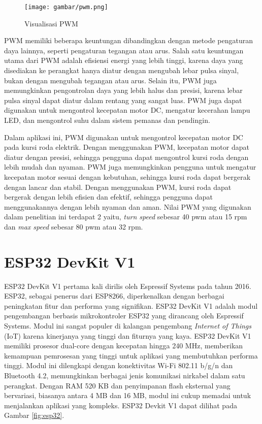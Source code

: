 \begin{figure} [ht] \centering
  \texttt{[image: gambar/pwm.png]}
  \caption{Visualisasi PWM}
  \label{fig:pwm}
\end{figure}

PWM memiliki beberapa keuntungan dibandingkan dengan metode pengaturan daya lainnya, seperti pengaturan tegangan atau arus. Salah satu keuntungan utama dari PWM adalah efisiensi energi yang lebih tinggi, karena daya yang disediakan ke perangkat hanya diatur dengan mengubah lebar pulsa sinyal, bukan dengan mengubah tegangan atau arus. Selain itu, PWM juga memungkinkan pengontrolan daya yang lebih halus dan presisi, karena lebar pulsa sinyal dapat diatur dalam rentang yang sangat luas. PWM juga dapat digunakan untuk mengontrol kecepatan motor DC, mengatur kecerahan lampu LED, dan mengontrol suhu dalam sistem pemanas dan pendingin.

Dalam aplikasi ini, PWM digunakan untuk mengontrol kecepatan motor DC pada kursi roda elektrik. Dengan menggunakan PWM, kecepatan motor dapat diatur dengan presisi, sehingga pengguna dapat mengontrol kursi roda dengan lebih mudah dan nyaman. PWM juga memungkinkan pengguna untuk mengatur kecepatan motor sesuai dengan kebutuhan, sehingga kursi roda dapat bergerak dengan lancar dan stabil. Dengan menggunakan PWM, kursi roda dapat bergerak dengan lebih efisien dan efektif, sehingga pengguna dapat menggunakannya dengan lebih nyaman dan aman. Nilai PWM yang digunakan dalam penelitian ini terdapat 2 yaitu, \emph{turn speed} sebesar 40 pwm atau 15 rpm dan \emph{max speed} sebesar 80 pwm atau 32 rpm.

\section{ESP32 DevKit V1}

ESP32 DevKit V1 pertama kali dirilis oleh Espressif Systems pada tahun 2016. ESP32, sebagai penerus dari ESP8266, diperkenalkan dengan berbagai peningkatan fitur dan performa yang signifikan. ESP32 DevKit V1 adalah modul pengembangan berbasis mikrokontroler ESP32 yang dirancang oleh Espressif Systems. Modul ini sangat populer di kalangan pengembang \emph{Internet of Things} (IoT) karena kinerjanya yang tinggi dan fiturnya yang kaya. ESP32 DevKit V1 memiliki prosesor dual-core dengan kecepatan hingga 240 MHz, memberikan kemampuan pemrosesan yang tinggi untuk aplikasi yang membutuhkan performa tinggi. Modul ini dilengkapi dengan konektivitas Wi-Fi 802.11 b/g/n dan Bluetooth 4.2, memungkinkan berbagai jenis komunikasi nirkabel dalam satu perangkat. Dengan RAM 520 KB dan penyimpanan flash eksternal yang bervariasi, biasanya antara 4 MB dan 16 MB, modul ini cukup memadai untuk menjalankan aplikasi yang kompleks. ESP32 Devkit V1 dapat dilihat pada Gambar \ref{fig:esp32}.

